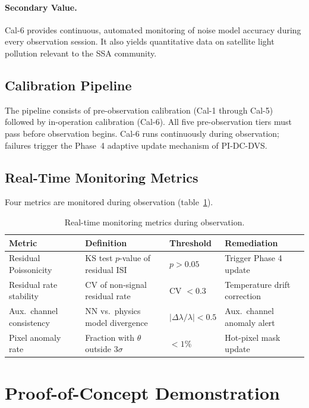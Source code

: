\documentclass[12pt]{article}
\begin{document}
\paragraph{Secondary Value.}
Cal-6 provides continuous, automated monitoring of noise model accuracy during every observation session.
It also yields quantitative data on satellite light pollution relevant to the SSA community.

\subsection{Calibration Pipeline}

The pipeline consists of pre-observation calibration (Cal-1 through Cal-5) followed by in-operation calibration (Cal-6).
All five pre-observation tiers must pass before observation begins.
Cal-6 runs continuously during observation; failures trigger the Phase~4 adaptive update mechanism of PI-DC-DVS.

\subsection{Real-Time Monitoring Metrics}

Four metrics are monitored during observation (table~\ref{tab:monitoring}).

\begin{table}[htbp]
\centering
\caption{Real-time monitoring metrics during observation.}
\label{tab:monitoring}
\begin{tabular}{@{}llll@{}}
\toprule
Metric & Definition & Threshold & Remediation \\
\midrule
Residual Poissonicity & KS test $p$-value of residual ISI & $p > 0.05$ & Trigger Phase 4 update \\
Residual rate stability & CV of non-signal residual rate & CV $< 0.3$ & Temperature drift correction \\
Aux.\ channel consistency & NN vs.\ physics model divergence & $|\Delta\lambda/\lambda| < 0.5$ & Aux.\ channel anomaly alert \\
Pixel anomaly rate & Fraction with $\theta$ outside $3\sigma$ & $< 1$\% & Hot-pixel mask update \\
\bottomrule
\end{tabular}
\end{table}


\section{Proof-of-Concept Demonstration}
\label{sec:demo}
\end{document}
